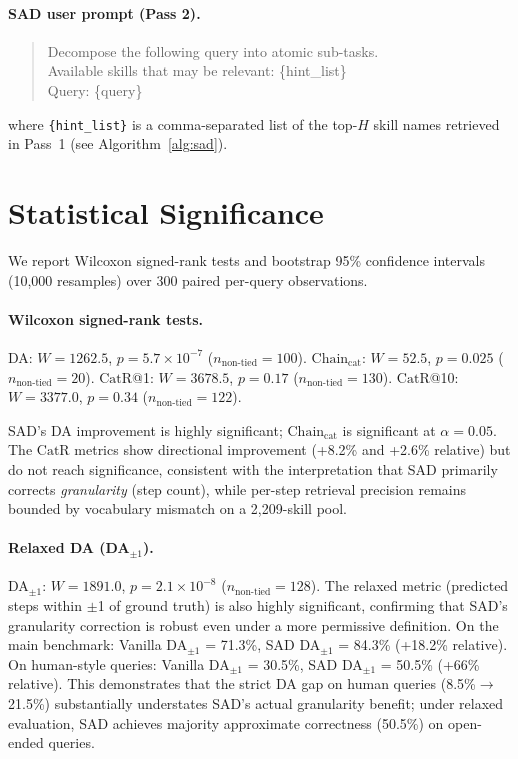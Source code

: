 \documentclass[11pt]{article}
\newcommand{\catrecall}{\text{CatR}}
\newcommand{\chaincat}{\text{Chain}_\text{cat}}
\begin{document}
\paragraph{SAD user prompt (Pass 2).}
\begin{quote}
\small\ttfamily
Decompose the following query into atomic sub-tasks.\\ Available skills that may be relevant: \{hint\_list\}\\ Query: \{query\}
\end{quote}

\noindent where \texttt{\{hint\_list\}} is a comma-separated list of the top-$H$ skill names retrieved in Pass~1 (see Algorithm~\ref{alg:sad}).

\section{Statistical Significance}
\label{app:stats}

We report Wilcoxon signed-rank tests and bootstrap 95\% confidence intervals (10{,}000 resamples) over 300 paired per-query observations.

\paragraph{Wilcoxon signed-rank tests.}
DA: $W{=}1262.5$, $p{=}5.7{\times}10^{-7}$ ($n_{\text{non-tied}}{=}100$).
$\chaincat$: $W{=}52.5$, $p{=}0.025$ ($n_{\text{non-tied}}{=}20$).
$\catrecall$@1: $W{=}3678.5$, $p{=}0.17$ ($n_{\text{non-tied}}{=}130$).
$\catrecall$@10: $W{=}3377.0$, $p{=}0.34$ ($n_{\text{non-tied}}{=}122$).

SAD's DA improvement is highly significant; $\chaincat$ is significant at $\alpha{=}0.05$.
The $\catrecall$ metrics show directional improvement (+8.2\% and +2.6\% relative) but do not reach significance, consistent with the interpretation that SAD primarily corrects \emph{granularity} (step count), while per-step retrieval precision remains bounded by vocabulary mismatch on a 2{,}209-skill pool.

\paragraph{Relaxed DA (DA$_{\pm 1}$).}
DA$_{\pm 1}$: $W{=}1891.0$, $p{=}2.1{\times}10^{-8}$ ($n_{\text{non-tied}}{=}128$).
The relaxed metric (predicted steps within $\pm$1 of ground truth) is also highly significant, confirming that SAD's granularity correction is robust even under a more permissive definition.
On the main benchmark: Vanilla DA$_{\pm 1}$ = 71.3\%, SAD DA$_{\pm 1}$ = 84.3\% (+18.2\% relative).
On human-style queries: Vanilla DA$_{\pm 1}$ = 30.5\%, SAD DA$_{\pm 1}$ = 50.5\% (+66\% relative).
This demonstrates that the strict DA gap on human queries (8.5\%$\to$21.5\%) substantially understates SAD's actual granularity benefit; under relaxed evaluation, SAD achieves majority approximate correctness (50.5\%) on open-ended queries.
\end{document}
